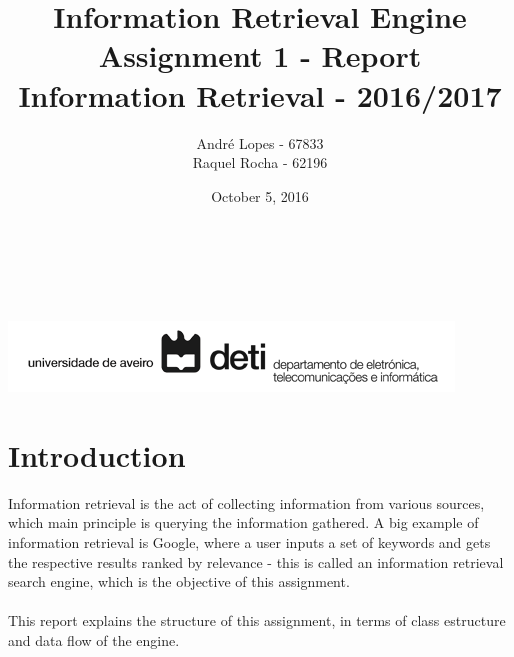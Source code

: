 \documentclass[11pt,a4paper]{report}
\title{\huge \textbf{Information Retrieval Engine}\\[0.2ex]
\large Assignment 1 - Report\\[1ex]
\large Information Retrieval - 2016/2017}
\author{\large Andr\'e Lopes - 67833\\[1ex]
        Raquel Rocha - 62196}
\date{\large October 5, 2016}
\begin{document}
\makeatletter
    \begin{titlepage}
        	\vspace*{\fill}
        \begin{center}
            {\@title }\\[2ex] 
            {\@author}\\[2ex] 
            {\@date}\\[5ex]
			\includegraphics[scale=0.8]{deti_logo.png}
        \end{center}
        
        	\vspace*{\fill}
    \end{titlepage}
\makeatother
\hypersetup{
    colorlinks,bookmarks=true,linktoc=all
}

\renewcommand*\contentsname{Table of Contents}
\tableofcontents
\vspace{2cm}
\setcounter{secnumdepth}{2}
\chapter{Introduction}

Information retrieval is the act of collecting information from various sources, which main principle is querying the information gathered. A big example of information retrieval is Google, where a user inputs a set of keywords and gets the respective results ranked by relevance - this is called an information retrieval search engine, which is the objective of this assignment.\\\\
This report explains the structure of this assignment, in terms of class estructure and data flow of the engine. 
\end{document}
